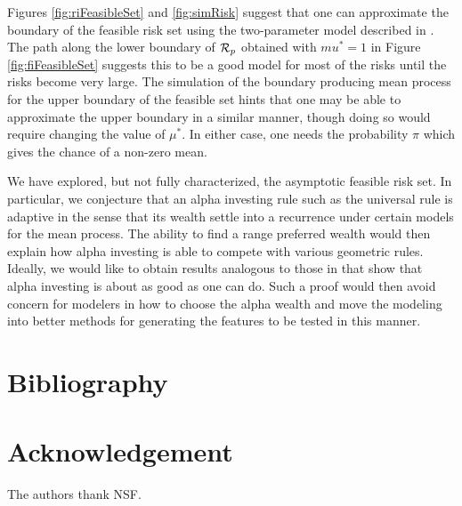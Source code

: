 \documentclass[12pt]{article}
\begin{document}
 Figures \ref{fig:riFeasibleSet} and \ref{fig:simRisk} suggest that one can
 approximate the boundary of the feasible risk set using the two-parameter model
 described in .  The path along the lower boundary of ${\cal R}_p$
 obtained with $mu^{*}=1$ in Figure \ref{fig:fiFeasibleSet} suggests this to be
 a good model for most of the risks until the risks become very large.  The
 simulation of the boundary producing mean process for the upper boundary of the
 feasible set hints that one may be able to approximate the upper boundary in a
 similar manner, though doing so would require changing the value of $\mu^{*}$.
  In either case, one needs the probability $\pi$ which gives the chance of a
 non-zero mean.

 
 We have explored, but not fully characterized, the asymptotic feasible risk
 set.  In particular, we conjecture that an alpha investing rule such as the
 universal rule is adaptive in the sense that its wealth settle into a
 recurrence under certain models for the mean process.  The ability to find a
 range preferred wealth would then explain how alpha investing is able to
 compete with various geometric rules.  Ideally, we would like to obtain results
 analogous to those in \citet{rissanen83} that show that alpha investing is
 about as good as one can do.  Such a proof would then avoid concern for
 modelers in how to choose the alpha wealth and move the modeling into better
 methods for generating the features to be tested in this manner.


\section{ Bibliography }
\section*{Acknowledgement}

The authors thank NSF.





\end{document}
